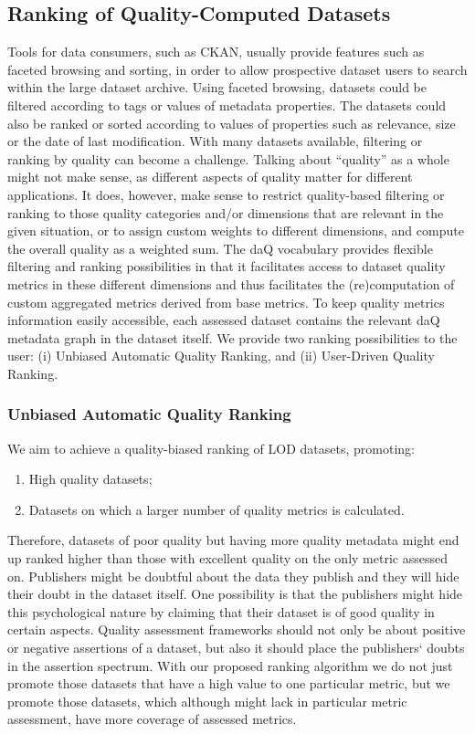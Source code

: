 
\subsection{Ranking of Quality-Computed Datasets}
\label{sec:Ranking} 
Tools for data consumers, such as CKAN, usually provide features such as faceted browsing and sorting, in order to allow prospective dataset users to search within the large dataset archive.
Using faceted browsing, datasets could be filtered according to tags or values of metadata properties.
The datasets could also be ranked or sorted according to values of properties such as relevance, size or the date of last modification.
With many datasets available, filtering or ranking by quality can become a challenge.
Talking about ``quality'' as a whole might not make sense, as different aspects of quality matter for different applications.
It does, however, make sense to restrict quality-based filtering or ranking to those quality categories and/or dimensions that are relevant in the given situation, or to assign custom weights to different dimensions, and compute the overall quality as a weighted sum.
The daQ vocabulary provides flexible filtering and ranking possibilities in that it facilitates access to dataset quality metrics in these different dimensions and thus facilitates the (re)computation of custom aggregated metrics derived from base metrics.
To keep quality metrics information easily accessible, each assessed dataset contains the relevant daQ metadata graph in the dataset itself.
We provide two ranking possibilities to the user: (i) Unbiased Automatic Quality Ranking, and (ii) User-Driven Quality Ranking.

\subsubsection{Unbiased Automatic Quality Ranking}
We aim to achieve a quality-biased ranking of LOD datasets, promoting:
\begin{enumerate}
\item High quality datasets;
\item Datasets on which a larger number of quality metrics is calculated. 
\end{enumerate}
Therefore, datasets of poor quality but having more quality metadata might end up ranked higher than those with excellent quality on the only metric assessed on.
Publishers might be doubtful about the data they publish and they will hide their doubt in the dataset itself.
One possibility is that the publishers might hide this psychological nature by claiming that their dataset is of good quality in certain aspects.
Quality assessment frameworks should not only be about positive or negative assertions of a dataset, but also it should place the publishers` doubts in the assertion spectrum.
With our proposed ranking algorithm we do not just promote those datasets that have a high value to one particular metric, but we promote those datasets, which although might lack in particular metric assessment, have more coverage of assessed metrics.

